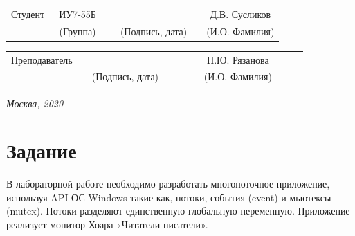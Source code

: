 \documentclass[14pt, a4paper]{extarticle}
\begin{document}
	
	\noindent
	\\
	
	\noindent
	\\
	
	\vspace{1.5cm}
	\noindent
	\begin{tabular}{l c c c c c}
		Студент      & ~ИУ7-55Б~               & \hspace{2.5cm} & \hspace{2cm}                 & &  Д.В. 
		Сусликов \\\cline{2-2}\cline{4-4} \cline{6-6} 
		\hspace{3cm} & {\footnotesize(Группа)} &                & {\footnotesize(Подпись, дата)} & & {\footnotesize(И.О. Фамилия)}
	\end{tabular}
	
	\noindent
	\begin{tabular}{l c c c c}
		Преподаватель & \hspace{5cm}   & \hspace{2cm}                 & & ~~~~~~Н.Ю. Рязанова~~~~~~\\\cline{3-3} \cline{5-5} 
		\hspace{3cm}  &                & {\footnotesize(Подпись, дата)} & & {\footnotesize(И.О. Фамилия)}
	\end{tabular}
	
	\vspace{0.6cm}
	\begin{center}	
		\vfill
		\large \textit {Москва, 2020}
	\end{center}
	
	\thispagestyle {empty}
	\pagebreak
	
	\clearpage
	\tableofcontents
	
	
	\clearpage
	\section*{Задание}
	В лабораторной работе необходимо разработать многопоточное приложение, используя API ОС Windows такие как, потоки, события (event) и мьютексы (mutex). Потоки разделяют единственную глобальную переменную. Приложение реализует монитор Хоара «Читатели-писатели».\par
	
\end{document}
